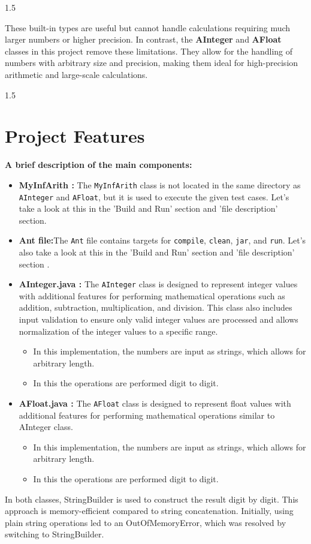 \documentclass{article}
\begin{document}
\begin{spacing}{1.5}
{\begin{itemize}
\end{itemize}

These built-in types are useful but cannot handle calculations requiring much larger numbers or higher precision. In contrast, the \textbf{AInteger} and \textbf{AFloat} classes in this project remove these limitations. They allow for the handling of numbers with arbitrary size and precision, making them ideal for high-precision arithmetic and large-scale calculations.}
 \end{spacing}
\begin{spacing}{1.5}{\large
\section{Project Features}
\textbf{ \large A brief description of the main components:}
\begin{itemize}
  \item\textbf{MyInfArith :} The \texttt{MyInfArith} class is not located in the same directory as \texttt{AInteger} and \texttt{AFloat}, but it is used to execute the given test cases. Let's take a look at this in the 'Build and Run' section and 'file description' section.
  \item\textbf{Ant file:}The \texttt{Ant} file contains targets for \texttt{compile}, \texttt{clean}, \texttt{jar}, and \texttt{run}. Let's also take a look at this in the 'Build and Run' section and 'file description' section .
  \item \textbf{AInteger.java :}
   The \texttt{AInteger} class is designed to represent integer values with additional features for performing mathematical operations such as addition, subtraction, multiplication, and division. This class also includes input validation to ensure only valid integer values are processed and allows normalization of the integer values to a specific range.
   \begin{itemize}
       \item In this implementation, the numbers are input as strings, which allows for arbitrary length.
       \item In this the operations are performed digit to digit.
   \end{itemize}

  
  \item \textbf{AFloat.java :}
   The \texttt{AFloat} class is designed to represent float values with additional features for performing mathematical operations similar to AInteger class.
   \begin{itemize}
       \item In this implementation, the numbers are input as strings, which allows for arbitrary length.
       \item In this the operations are performed digit to digit.
   \end{itemize}
\end{itemize}
In both classes, StringBuilder is used to construct the result digit by digit. This approach is memory-efficient compared to string concatenation. Initially, using plain string operations led to an OutOfMemoryError, which was resolved by switching to StringBuilder.
}
\end{spacing}
\end{document}
